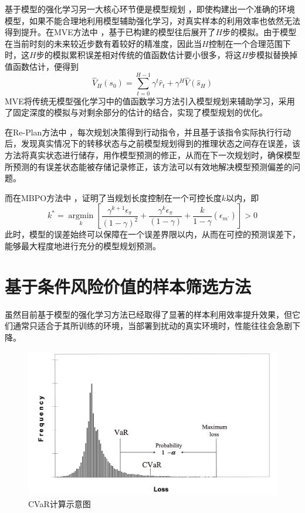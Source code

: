 基于模型的强化学习另一大核心环节便是模型规划 \cite{walsh2010integrating}，即使构建出一个准确的环境模型，如果不能合理地利用模型辅助强化学习，对真实样本的利用效率也依然无法得到提升。在MVE方法中 \cite{feinberg2018model}，基于已构建的模型往后展开了$H$步的模拟。由于模型在当前时刻的未来较近步数有着较好的精准度，因此当$H$控制在一个合理范围下时，这$H$步的模拟累积误差相对传统的值函数估计要小很多，将这$H$步模拟替换掉值函数估计，便得到
\begin{equation}
    \hat{V}_{H}\left(s_{0}\right)=\sum_{t=0}^{H-1} \gamma^{t} \hat{r}_{t}+\gamma^{H} \hat{V}\left(\hat{s}_{H}\right)
\end{equation}
MVE将传统无模型强化学习中的值函数学习方法引入模型规划来辅助学习，采用了固定深度的模拟与对剩余部分的估计的结合，实现了模型规划的优化。

在Re-Plan方法中 \cite{williams2017information}，每次规划决策得到行动指令，并且基于该指令实际执行行动后，发现真实情况下的转移状态与之前模型规划得到的推理状态之间存在误差，该方法将真实状态进行储存，用作模型预测的修正，从而在下一次规划时，确保模型所预测的有误差状态能被存储记录修正，该方法可以有效地解决模型预测偏差的问题。

而在MBPO方法中 \cite{janner2019trust}，证明了当规划长度控制在一个可控长度$k$以内，即
\begin{equation}
k^{*}=\underset{k}{\operatorname{argmin}}\left[\frac{\gamma^{k+1} \epsilon_{\pi}}{(1-\gamma)^{2}}+\frac{\gamma^{k} \epsilon_{\pi}}{(1-\gamma)}+\frac{k}{1-\gamma}\left(\epsilon_{m^{\prime}}\right)\right]>0
\end{equation}
此时，模型的误差始终可以保障在一个误差界限以内，从而在可控的预测误差下，能够最大程度地进行充分的模型规划预测。

\section{基于条件风险价值的样本筛选方法}

虽然目前基于模型的强化学习方法已经取得了显著的样本利用效率提升效果，但它们通常只适合于其所训练的环境，当部署到扰动的真实环境时，性能往往会急剧下降。

\begin{figure}
  \centering
  \includegraphics[width=\linewidth]{figures/CVaR.png}
  \caption{CVaR计算示意图}
  \label{fig:cvar}
\end{figure}

